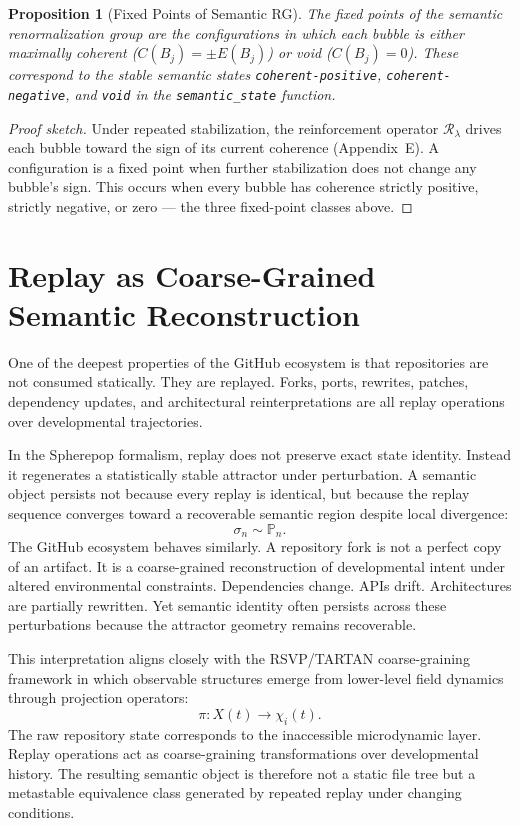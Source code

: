 \documentclass[11pt]{article}
\newtheorem{proposition}[theorem]{Proposition}
\begin{document}
\begin{proposition}[Fixed Points of Semantic RG]
The fixed points of the semantic renormalization group are the configurations
in which each bubble is either maximally coherent ($C(B_j) = \pm E(B_j)$) or
void ($C(B_j) = 0$). These correspond to the stable semantic states
\texttt{coherent-positive}, \texttt{coherent-negative}, and \texttt{void}
in the \texttt{semantic\_state} function.
\end{proposition}

\begin{proof}[Proof sketch]
Under repeated stabilization, the reinforcement operator $\mathcal{R}_\lambda$
drives each bubble toward the sign of its current coherence (Appendix~E). A
configuration is a fixed point when further stabilization does not change any
bubble's sign. This occurs when every bubble has coherence strictly positive,
strictly negative, or zero --- the three fixed-point classes above.
\end{proof}

\section{Replay as Coarse-Grained Semantic Reconstruction}

One of the deepest properties of the GitHub ecosystem is that repositories are
not consumed statically. They are replayed. Forks, ports, rewrites, patches,
dependency updates, and architectural reinterpretations are all replay operations
over developmental trajectories.

In the Spherepop formalism, replay does not preserve exact state identity.
Instead it regenerates a statistically stable attractor under perturbation. A
semantic object persists not because every replay is identical, but because the
replay sequence converges toward a recoverable semantic region despite local
divergence:
\[
\sigma_n \sim \mathbb{P}_n.
\]
The GitHub ecosystem behaves similarly. A repository fork is not a perfect copy
of an artifact. It is a coarse-grained reconstruction of developmental intent
under altered environmental constraints. Dependencies change. APIs drift.
Architectures are partially rewritten. Yet semantic identity often persists
across these perturbations because the attractor geometry remains recoverable.

This interpretation aligns closely with the RSVP/TARTAN coarse-graining
framework in which observable structures emerge from lower-level field dynamics
through projection operators:
\[
\pi : X(t) \to \chi_i(t).
\]
The raw repository state corresponds to the inaccessible microdynamic layer.
Replay operations act as coarse-graining transformations over developmental
history. The resulting semantic object is therefore not a static file tree but
a metastable equivalence class generated by repeated replay under changing
conditions.
\end{document}
